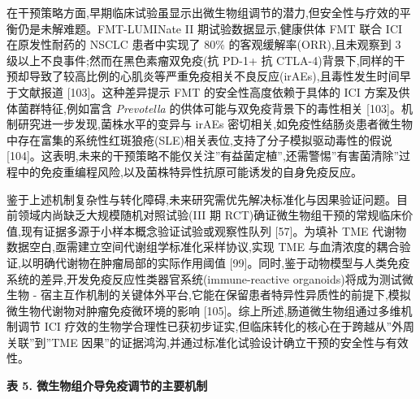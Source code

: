 \documentclass[11pt]{article}
\begin{document}
在干预策略方面,早期临床试验虽显示出微生物组调节的潜力,但安全性与疗效的平衡仍是未解难题。FMT-LUMINate II 期试验数据显示,健康供体 FMT 联合 ICI 在原发性耐药的 NSCLC 患者中实现了 80\% 的客观缓解率(ORR),且未观察到 3 级以上不良事件;然而在黑色素瘤双免疫(抗 PD-1+ 抗 CTLA-4)背景下,同样的干预却导致了较高比例的心肌炎等严重免疫相关不良反应(irAEs),且毒性发生时间早于文献报道 {[}103{]}。这种差异提示 FMT 的安全性高度依赖于具体的 ICI 方案及供体菌群特征,例如富含 \emph{Prevotella} 的供体可能与双免疫背景下的毒性相关 {[}103{]}。机制研究进一步发现,菌株水平的变异与 irAEs 密切相关,如免疫性结肠炎患者微生物中存在富集的系统性红斑狼疮(SLE)相关表位,支持了分子模拟驱动毒性的假说 {[}104{]}。这表明,未来的干预策略不能仅关注''有益菌定植'',还需警惕''有害菌清除''过程中的免疫重编程风险,以及菌株特异性抗原可能诱发的自身免疫反应。

鉴于上述机制复杂性与转化障碍,未来研究需优先解决标准化与因果验证问题。目前领域内尚缺乏大规模随机对照试验(III 期 RCT)确证微生物组干预的常规临床价值,现有证据多源于小样本概念验证试验或观察性队列 {[}57{]}。为填补 TME 代谢物数据空白,亟需建立空间代谢组学标准化采样协议,实现 TME 与血清浓度的耦合验证,以明确代谢物在肿瘤局部的实际作用阈值 {[}99{]}。同时,鉴于动物模型与人类免疫系统的差异,开发免疫反应性类器官系统(immune-reactive organoids)将成为测试微生物 - 宿主互作机制的关键体外平台,它能在保留患者特异性异质性的前提下,模拟微生物代谢物对肿瘤免疫微环境的影响 {[}105{]}。综上所述,肠道微生物组通过多维机制调节 ICI 疗效的生物学合理性已获初步证实,但临床转化的核心在于跨越从''外周关联''到''TME 因果''的证据鸿沟,并通过标准化试验设计确立干预的安全性与有效性。

\textbf{表 5. 微生物组介导免疫调节的主要机制}
\end{document}
